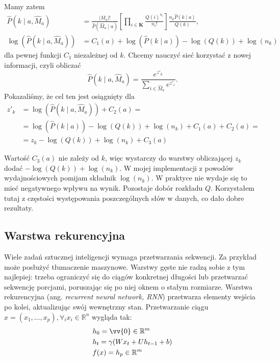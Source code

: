 \noindent
Mamy zatem
\[
\begin{aligned}
\hat{P}(k \mid a, \hat{M}_a) &= \frac{|M_a|!}{\hat{P}(\hat{M}_a \mid a)} \left[ \prod\limits_{i \in \mathbf{K}} \frac{Q(i)^{n_i}}{n_i!} \right] \frac{n_k \hat{P}(k \mid a)}{Q(k)}, \\[3pt]
\log(\hat{P}(k \mid a, \hat{M}_a)) &= C_1(a) + \log(\hat{P}(k \mid a)) - \log(Q(k)) + \log(n_k)
\end{aligned}
\]
dla pewnej funkcji $C_1$ niezależnej od $k$. Chcemy nauczyć sieć korzystać z nowej informacji, czyli obliczać
\[\hat{P}(k \mid a, \hat{M}_a) = \frac{e^{z'_{k}}}{\sum_{i \in \hat{M}_a} e^{z'_i}}.\]
Pokazaliśmy, że cel ten jest osiągnięty dla
\[
\begin{aligned}
z'_k &= \log(\hat{P}(k \mid a, \hat{M}_a)) + C_2(a) = \\[3pt]
     &= \log(\hat{P}(k \mid a)) - \log(Q(k)) + \log(n_k) + C_1(a) + C_2(a) = \\[3pt]
     &= z_k - \log(Q(k)) + \log(n_k) + C_3(a)
\end{aligned}
\]

Wartość $C_3(a)$ nie zależy od $k$, więc wystarczy do warstwy obliczającej $z_k$ dodać $- \log(Q(k)) + \log(n_k)$. W mojej implementacji z powodów wydajnościowych pomijam składnik $\log(n_k)$. W praktyce nie wydaje się to mieć negatywnego wpływu na wynik. Pozostaje dobór rozkładu $Q$. Korzystałem tutaj z częstości występowania poszczególnych słów w danych, co dało dobre rezultaty.


\subsection{Warstwa rekurencyjna} \label{rnn}
Wiele zadań sztucznej inteligencji wymaga przetwarzania sekwencji. Za przykład może posłużyć tłumaczenie maszynowe. Warstwy gęste nie radzą sobie z tym najlepiej: trzeba ograniczyć się do ciągów konkretnej długości lub przetwarzać sekwencję porcjami, poruszając się po niej oknem o stałym rozmiarze. Warstwa rekurencyjna (ang. \textit{recurrent neural network, RNN}) przetwarza elementy wejścia po kolei, aktualizując swój wewnętrzny stan. Przetwarzanie ciągu $x = (x_1, \dots, x_p), \forall_i x_i \in \mathbb{R}^n$ wygląda tak:
\[
\begin{aligned}
    & h_0 = \vv{0} \in \mathbb{R}^m \\
    & h_t = \gamma(W x_t + U h_{t-1} + b) \\
    & f(x) = h_p \in \mathbb{R}^m
\end{aligned}
\]

